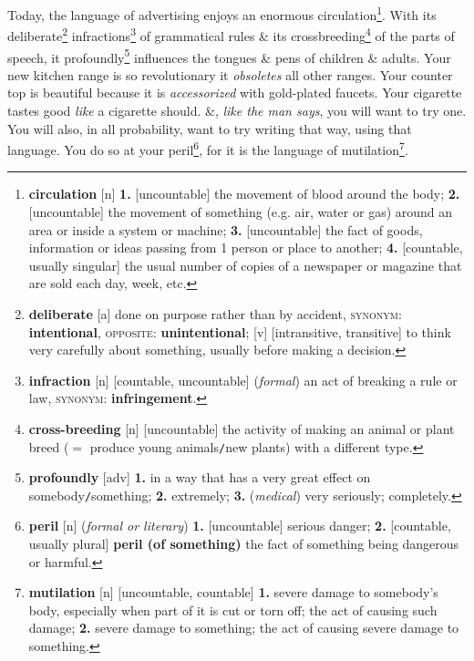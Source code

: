 \documentclass[oneside]{book}
\numberwithin{equation}{section}
\begin{document}
Today, the language of advertising enjoys an enormous circulation\footnote{\textbf{circulation} [n] \textbf{1.} [uncountable] the movement of blood around the body; \textbf{2.} [uncountable] the movement of something (e.g. air, water or gas) around an area or inside a system or machine; \textbf{3.} [uncountable] the fact of goods, information or ideas passing from 1 person or place to another; \textbf{4.} [countable, usually singular] the usual number of copies of a newspaper or magazine that are sold each day, week, etc.}. With its deliberate\footnote{\textbf{deliberate} [a] done on purpose rather than by accident, \textsc{synonym}: \textbf{intentional}, \textsc{opposite}: \textbf{unintentional}; [v] [intransitive, transitive] to think very carefully about something, usually before making a decision.} infractions\footnote{\textbf{infraction} [n] [countable, uncountable] (\textit{formal}) an act of breaking a rule or law, \textsc{synonym}: \textbf{infringement}.} of grammatical rules \& its crossbreeding\footnote{\textbf{cross-breeding} [n] [uncountable] the activity of making an animal or plant breed ($=$ produce young animals\texttt{/}new plants) with a different type.} of the parts of speech, it profoundly\footnote{\textbf{profoundly} [adv] \textbf{1.} in a way that has a very great effect on somebody\texttt{/}something; \textbf{2.} extremely; \textbf{3.} (\textit{medical}) very seriously; completely.} influences the tongues \& pens of children \& adults. Your new kitchen range is so revolutionary it \textit{obsoletes} all other ranges. Your counter top is beautiful because it is \textit{accessorized} with gold-plated faucets. Your cigarette tastes good \textit{like} a cigarette should. \&, \textit{like the man says}, you will want to try one. You will also, in all probability, want to try writing that way, using that language. You do so at your peril\footnote{\textbf{peril} [n] (\textit{formal or literary}) \textbf{1.} [uncountable] serious danger; \textbf{2.} [countable, usually plural] \textbf{peril (of something)} the fact of something being dangerous or harmful.}, for it is the language of mutilation\footnote{\textbf{mutilation} [n] [uncountable, countable] \textbf{1.} severe damage to somebody's body, especially when part of it is cut or torn off; the act of causing such damage; \textbf{2.} severe damage to something; the act of causing severe damage to something.}.
\end{document}
